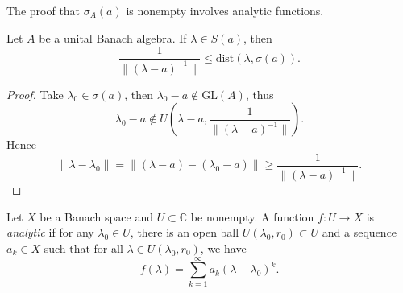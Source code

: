 The proof that $\sigma_A(a)$ is nonempty involves analytic functions.

\begin{proposition}
	\label{prop:DistanceFromSpectrumA}
	
	Let $A$ be a unital Banach algebra. If $\lambda \in S(a)$, then
	\[
		\frac{1}{\|(\lambda - a)^{-1}\|} \le \text{dist}(\lambda, \sigma(a))
	.\] 
\end{proposition}
\begin{proof}
	Take $\lambda_0 \in \sigma(a)$, then $\lambda_0 - a \not\in \text{GL}(A)$, thus
	\[
		\lambda_0 - a \not\in U(\lambda - a, \frac{1}{\|(\lambda - a)^{-1}\|})
	.\] 
	Hence
	\[
		\|\lambda - \lambda_0\| = \|(\lambda - a) - (\lambda_0 - a)\| \ge  \frac{1}{\|(\lambda - a)^{-1}\|}
	.\] 
\end{proof}

\begin{definition}
	\label{defn:VectvaluedAnalyticFunction}
	Let $X$ be a Banach space and $U \subset \mathbb{C}$ be nonempty. A function $f: U\to X$ is \textit{analytic} if for any $\lambda_0 \in U$, there is an open ball $U(\lambda_0, r_0) \subset U$ and a sequence $a_k \in X$ such that for all $\lambda \in U(\lambda_0, r_0)$, we have
	\[
		f(\lambda) = \sum_{k=1}^{\infty} a_k (\lambda - \lambda_0)^k
	.\] 
\end{definition}


